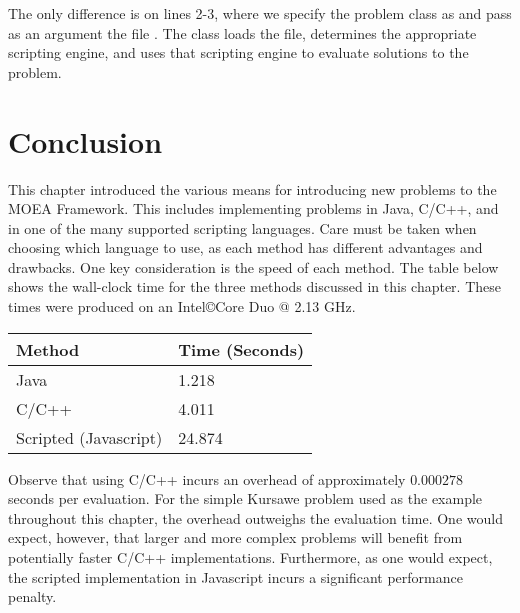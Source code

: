 The only difference is on lines 2-3, where we specify the problem class as  and pass as an argument the file .  The  class loads the file, determines the appropriate scripting engine, and uses that scripting engine to evaluate solutions to the problem.

\section{Conclusion}
This chapter introduced the various means for introducing new problems to the MOEA Framework.  This includes implementing problems in Java, C/C++, and in one of the many supported scripting languages.  Care must be taken when choosing which language to use, as each method has different advantages and drawbacks.  One key consideration is the speed of each method.  The table below shows the wall-clock time for the three methods discussed in this chapter.  These times were produced on an Intel\copyright Core Duo @ 2.13 GHz.

\par
\begin{center}
\begin{tabular}{ll}
  Method & Time (Seconds) \\
  \hline
  Java & 1.218 \\
  C/C++ & 4.011 \\
  Scripted (Javascript) & 24.874
\end{tabular}
\end{center}

Observe that using C/C++ incurs an overhead of approximately $0.000278$ seconds per evaluation.  For the simple Kursawe problem used as the example throughout this chapter, the overhead outweighs the evaluation time.  One would expect, however, that larger and more complex problems will benefit from potentially faster C/C++ implementations.  Furthermore, as one would expect, the scripted implementation in Javascript incurs a significant performance penalty.

